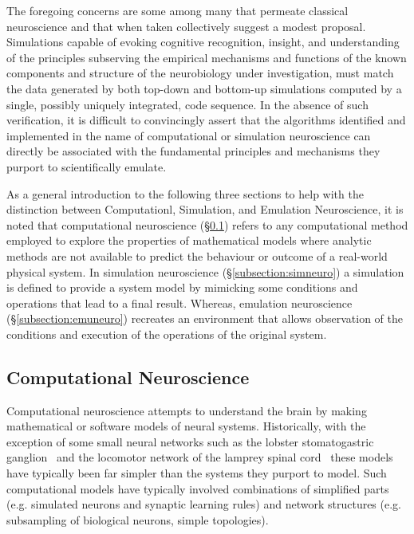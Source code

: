 \documentclass[11pt,3p,twocolumn]{JMN}
\begin{document}
The foregoing concerns are some among many that permeate classical neuroscience and that when taken collectively suggest a modest proposal. Simulations capable of evoking cognitive recognition, insight, and understanding of the principles subserving the empirical mechanisms and functions of the known components and structure of the neurobiology under investigation, must match the data generated by both top-down and bottom-up simulations computed by a single, possibly uniquely integrated, code sequence. In the absence of such verification, it is difficult to convincingly assert that the algorithms identified and implemented in the name of computational or simulation neuroscience can directly be associated with the fundamental principles and mechanisms they purport to scientifically emulate.

As a general introduction to the following three sections to help with the distinction between Computationl, Simulation, and Emulation Neuroscience, it is noted that computational neuroscience (\S\ref{subsection:compneuro}) refers to any computational method employed to explore the properties of mathematical models where analytic methods are not available to predict the behaviour or outcome of a real-world physical system. In simulation neuroscience (\S\ref{subsection:simneuro}) a simulation is defined to provide a system model by mimicking some conditions and operations that lead to a final result. Whereas, emulation neuroscience (\S\ref{subsection:emuneuro}) recreates an environment that allows observation of the conditions and execution of the operations of the original system.

\subsection{Computational Neuroscience}
\label{subsection:compneuro}

Computational neuroscience attempts to understand the brain by making mathematical or software models of neural systems. Historically, with the exception of some small neural networks such as the lobster stomatogastric ganglion~\citep{nusbaum02} and the locomotor network of the lamprey spinal cord~\citep{kozlov07} these models have typically been far simpler than the systems they purport to model. Such computational models have typically involved combinations of simplified parts (e.g. simulated neurons and synaptic learning rules) and network structures (e.g. subsampling of biological neurons, simple topologies).
\end{document}
